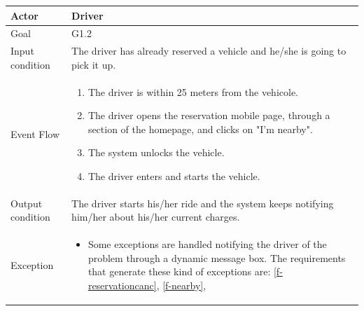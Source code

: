 \begin{table}[H]
	\begin{center}
		\begin{tabular}{| l | p{} |}
			\hline
			Actor & Driver \\
			\hline
			Goal & G1.2
			\\
			\hline
			Input condition & The driver has already reserved a vehicle and he/she is going to pick it up.  \\
			\hline
			Event Flow & \begin{enumerate}
				\item The driver is within 25 meters from the vehicole.
				\item The driver opens the reservation mobile page, through a section of the homepage, and clicks on "I'm nearby".
				\item The system unlocks the vehicle.
				\item The driver enters and starts the vehicle. 
			\end{enumerate}
			\\
			\hline
			Output condition & The driver starts his/her ride and the system keeps notifying him/her about his/her current charges. \\
			\hline
			
			Exception &  \begin{itemize}
				\item Some exceptions are handled notifying the driver of the problem through a dynamic message box.				
				The requirements that generate these kind of exceptions are:
				\ref{f-reservationcanc},    %
				\ref{f-nearby},    %
			\end{itemize}
			\\
			\hline
		\end{tabular}
	\end{center}
\end{table}

